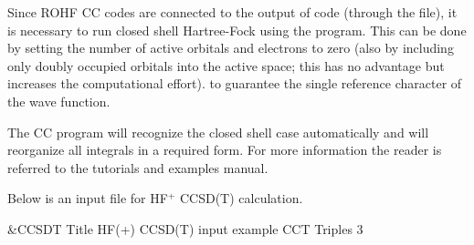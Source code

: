   Since ROHF CC codes are connected to the output of  code (through the
 file), it is necessary to run closed shell Hartree-Fock using
the  program. This can be done by setting the number of active orbitals
and electrons to zero (also by including only doubly occupied orbitals into the
active space; this has no advantage but increases the computational effort).
to guarantee the single reference character of the wave function.

 The CC program will recognize the closed shell case automatically and will reorganize
all integrals in a required form.
For more information the reader is referred to the tutorials and examples manual.

Below is an input file for HF$^{+}$ CCSD(T) calculation.

\begin{inputlisting}
 &CCSDT
Title
 HF(+) CCSD(T) input example
CCT
Triples
3
\end{inputlisting}

